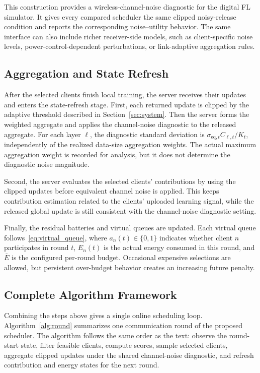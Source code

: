 \documentclass[journal]{IEEEtran}
\begin{document}
This construction provides a wireless-channel-noise diagnostic for the digital FL simulator. It gives every compared scheduler the same clipped noisy-release condition and reports the corresponding noise--utility behavior. The same interface can also include richer receiver-side models, such as client-specific noise levels, power-control-dependent perturbations, or link-adaptive aggregation rules.

\subsection{Aggregation and State Refresh}

After the selected clients finish local training, the server receives their updates and enters the state-refresh stage. First, each returned update is clipped by the adaptive threshold described in Section~\ref{sec:system}. Then the server forms the weighted aggregate and applies the channel-noise diagnostic to the released aggregate. For each layer $\ell$, the diagnostic standard deviation is $\sigma_{\mathrm{eq},t}C_{\ell,t}/K_t$, independently of the realized data-size aggregation weights. The actual maximum aggregation weight is recorded for analysis, but it does not determine the diagnostic noise magnitude.

Second, the server evaluates the selected clients' contributions by using the clipped updates before equivalent channel noise is applied. This keeps contribution estimation related to the clients' uploaded learning signal, while the released global update is still consistent with the channel-noise diagnostic setting.

Finally, the residual batteries and virtual queues are updated. Each virtual queue follows~\eqref{eq:virtual_queue}, where $a_n(t) \in \{0,1\}$ indicates whether client $n$ participates in round $t$, $E_n(t)$ is the actual energy consumed in this round, and $\bar{E}$ is the configured per-round budget. Occasional expensive selections are allowed, but persistent over-budget behavior creates an increasing future penalty.

\subsection{Complete Algorithm Framework}

Combining the steps above gives a single online scheduling loop. Algorithm~\ref{alg:round} summarizes one communication round of the proposed scheduler. The algorithm follows the same order as the text: observe the round-start state, filter feasible clients, compute scores, sample selected clients, aggregate clipped updates under the shared channel-noise diagnostic, and refresh contribution and energy states for the next round.
\end{document}
